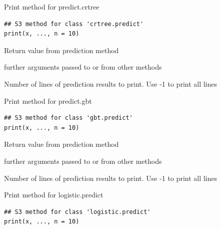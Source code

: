 \documentclass[a4paper]{book}
\begin{document}
%
\begin{Description}
Print method for predict.crtree
\end{Description}
%
\begin{Usage}
\begin{verbatim}
## S3 method for class 'crtree.predict'
print(x, ..., n = 10)
\end{verbatim}
\end{Usage}
%
\begin{Arguments}
\begin{ldescription}
\item[\code{x}] Return value from prediction method

\item[\code{...}] further arguments passed to or from other methods

\item[\code{n}] Number of lines of prediction results to print. Use -1 to print all lines
\end{ldescription}
\end{Arguments}
%
\begin{Description}
Print method for predict.gbt
\end{Description}
%
\begin{Usage}
\begin{verbatim}
## S3 method for class 'gbt.predict'
print(x, ..., n = 10)
\end{verbatim}
\end{Usage}
%
\begin{Arguments}
\begin{ldescription}
\item[\code{x}] Return value from prediction method

\item[\code{...}] further arguments passed to or from other methods

\item[\code{n}] Number of lines of prediction results to print. Use -1 to print all lines
\end{ldescription}
\end{Arguments}
%
\begin{Description}
Print method for logistic.predict
\end{Description}
%
\begin{Usage}
\begin{verbatim}
## S3 method for class 'logistic.predict'
print(x, ..., n = 10)
\end{verbatim}
\end{Usage}
\end{document}

